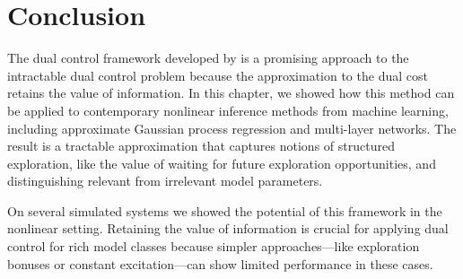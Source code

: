 \section{Conclusion}

The dual control framework developed by \textcite{Tse.Bar-Shalom:1973:Actively}
is a promising approach to the intractable dual control problem because the
approximation to the dual cost retains the value of information. In this
chapter, we showed how this method can be applied to contemporary
nonlinear inference methods from machine learning, including approximate
Gaussian process regression and multi-layer networks. The result is a tractable
approximation that captures notions of structured exploration, like the value of
waiting for future exploration opportunities, and distinguishing relevant from
irrelevant model parameters.

On several simulated systems we showed the potential of this framework in the
nonlinear setting. Retaining the value of information is crucial for applying
dual control for rich model classes because simpler approaches---like
exploration bonuses or constant excitation---can show limited performance
in these cases.
